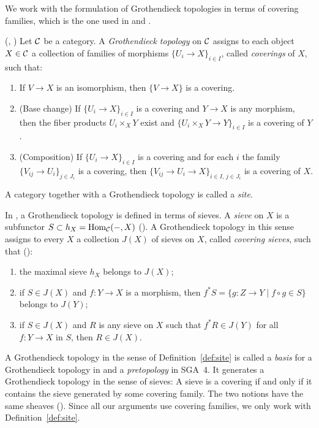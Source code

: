 We work with the formulation of Grothendieck topologies in terms of covering families, which is the one used in \cite{stacks-project} and \cite{vistoli2007notes}.

\begin{definition}[Site]\label{def:site}
	(\cite[][Definition 2.24]{vistoli2007notes}, \cite[][Tag 00VH]{stacks-project})
	Let $\mathcal{C}$ be a category. A \emph{Grothendieck topology} on $\mathcal{C}$ assigns to each object $X\in\mathcal{C}$ a collection of families of morphisms $\{U_i\to X\}_{i\in I}$, called \emph{coverings} of $X$, such that:
	\begin{enumerate}
		\item If $V\to X$ is an isomorphism, then $\{V\to X\}$ is a covering.
		\item (Base change) If $\{U_i\to X\}_{i\in I}$ is a covering and $Y\to X$ is any morphism, then the fiber products $U_i\times_X Y$ exist and $\{U_i\times_X Y\to Y\}_{i\in I}$ is a covering of $Y$.
		\item (Composition) If $\{U_i\to X\}_{i\in I}$ is a covering and for each $i$ the family $\{V_{ij}\to U_i\}_{j\in J_i}$ is a covering, then $\{V_{ij}\to U_i\to X\}_{i\in I,\,j\in J_i}$ is a covering of $X$.
	\end{enumerate}
	A category together with a Grothendieck topology is called a \emph{site}.
\end{definition}

\begin{remark}[Sieves]\label{rem:sieves}
	In \cite{MacLaneMoerdijk1992}, a Grothendieck topology is defined in terms of sieves. A \emph{sieve} on $X$ is a subfunctor $S\subset h_X=\operatorname{Hom}_{\mathcal{C}}(-,X)$ (\cite[][p.~38]{MacLaneMoerdijk1992}). A Grothendieck topology in this sense assigns to every $X$ a collection $J(X)$ of sieves on $X$, called \emph{covering sieves}, such that (\cite[][Sec.~III.2, Def.~1]{MacLaneMoerdijk1992}):
	\begin{enumerate}
		\item the maximal sieve $h_X$ belongs to $J(X)$;
		\item if $S\in J(X)$ and $f:Y\to X$ is a morphism, then $f^*S=\{g:Z\to Y\mid f\circ g\in S\}$ belongs to $J(Y)$;
		\item if $S\in J(X)$ and $R$ is any sieve on $X$ such that $f^*R\in J(Y)$ for all $f:Y\to X$ in $S$, then $R\in J(X)$.
	\end{enumerate}
	A Grothendieck topology in the sense of Definition~\ref{def:site} is called a \emph{basis} for a Grothendieck topology in \cite[][Sec.~III.2, Def.~2]{MacLaneMoerdijk1992} and a \emph{pretopology} in SGA~4. It generates a Grothendieck topology in the sense of sieves: A sieve is  a covering if and only if it contains the sieve generated by some covering family. The two notions have the same sheaves (\cite[][Remark~2.25 and Proposition~2.42]{vistoli2007notes}). Since all our arguments use covering families, we only work with Definition~\ref{def:site}.
\end{remark}

